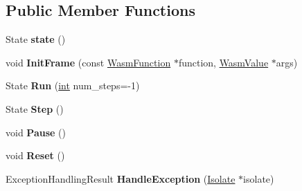 \subsection*{Public Member Functions}
\begin{DoxyCompactItemize}
\item 
\mbox{\label{classv8_1_1internal_1_1wasm_1_1WasmInterpreter_1_1Thread_ad85c512f4ea8a4be553b21dd98e84243}} 
State {\bfseries state} ()
\item 
\mbox{\label{classv8_1_1internal_1_1wasm_1_1WasmInterpreter_1_1Thread_a3c187b2c4ab33bd6744e37fb3116a991}} 
void {\bfseries Init\+Frame} (const \mbox{\hyperlink{structv8_1_1internal_1_1wasm_1_1WasmFunction}{Wasm\+Function}} $\ast$function, \mbox{\hyperlink{classv8_1_1internal_1_1wasm_1_1WasmValue}{Wasm\+Value}} $\ast$args)
\item 
\mbox{\label{classv8_1_1internal_1_1wasm_1_1WasmInterpreter_1_1Thread_ad9f7f349e868eea635348b64abe727b6}} 
State {\bfseries Run} (\mbox{\hyperlink{classint}{int}} num\+\_\+steps=-\/1)
\item 
\mbox{\label{classv8_1_1internal_1_1wasm_1_1WasmInterpreter_1_1Thread_a0d7dfc0f816c938e1c54ca99a965fb92}} 
State {\bfseries Step} ()
\item 
\mbox{\label{classv8_1_1internal_1_1wasm_1_1WasmInterpreter_1_1Thread_a10630cbe025ba4da2202817bacd1b47f}} 
void {\bfseries Pause} ()
\item 
\mbox{\label{classv8_1_1internal_1_1wasm_1_1WasmInterpreter_1_1Thread_af7a222d0926d321496d215d083f4d8c7}} 
void {\bfseries Reset} ()
\item 
\mbox{\label{classv8_1_1internal_1_1wasm_1_1WasmInterpreter_1_1Thread_a0fc0af0675369be116d6d73b2b5b94ad}} 
Exception\+Handling\+Result {\bfseries Handle\+Exception} (\mbox{\hyperlink{classv8_1_1internal_1_1Isolate}{Isolate}} $\ast$isolate)

\end{DoxyCompactItemize}
